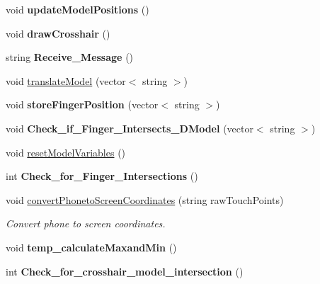 \begin{DoxyCompactItemize}
\item 
\hypertarget{classtest_app_a4f0adc57489b13878194958d0f2da032}{void {\bfseries update\-Model\-Positions} ()}\label{classtest_app_a4f0adc57489b13878194958d0f2da032}

\item 
\hypertarget{classtest_app_a9d57148d51d852b0fe1051ee150f0fc0}{void {\bfseries draw\-Crosshair} ()}\label{classtest_app_a9d57148d51d852b0fe1051ee150f0fc0}

\item 
\hypertarget{classtest_app_a9388efd101d9850bdf41ed036861e369}{string {\bfseries Receive\-\_\-\-Message} ()}\label{classtest_app_a9388efd101d9850bdf41ed036861e369}

\item 
void \hyperlink{classtest_app_a8afafb31eb516994348caaf54bdea6bb}{translate\-Model} (vector$<$ string $>$)
\item 
\hypertarget{classtest_app_aff620776a9cf806d8555de9a501fdcee}{void {\bfseries store\-Finger\-Position} (vector$<$ string $>$)}\label{classtest_app_aff620776a9cf806d8555de9a501fdcee}

\item 
\hypertarget{classtest_app_a5631a4b034f1558b451fed3868480222}{void {\bfseries Check\-\_\-if\-\_\-\-Finger\-\_\-\-Intersects\-\_\-D\-Model} (vector$<$ string $>$)}\label{classtest_app_a5631a4b034f1558b451fed3868480222}

\item 
void \hyperlink{classtest_app_ac374af2c9d11d72f27d79e16f3902b95}{reset\-Model\-Variables} ()
\item 
\hypertarget{classtest_app_a2397b9317004e36fb25ca77bb7f99d50}{int {\bfseries Check\-\_\-for\-\_\-\-Finger\-\_\-\-Intersections} ()}\label{classtest_app_a2397b9317004e36fb25ca77bb7f99d50}

\item 
void \hyperlink{classtest_app_af4304932dc358f431608e54b243f74e5}{convert\-Phoneto\-Screen\-Coordinates} (string raw\-Touch\-Points)
\begin{DoxyCompactList}\small\item\em Convert phone to screen coordinates. \end{DoxyCompactList}\item 
\hypertarget{classtest_app_ae813833c1d2e4917d75984d1828f0c30}{void {\bfseries temp\-\_\-calculate\-Maxand\-Min} ()}\label{classtest_app_ae813833c1d2e4917d75984d1828f0c30}

\item 
\hypertarget{classtest_app_acff4b4d2d795806c8586f83602457ed7}{int {\bfseries Check\-\_\-for\-\_\-crosshair\-\_\-model\-\_\-intersection} ()}\label{classtest_app_acff4b4d2d795806c8586f83602457ed7}

\end{DoxyCompactItemize}
